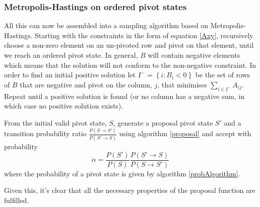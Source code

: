 \subsubsection{Metropolis-Hastings on ordered pivot states}

All this can now be assembled into a sampling algorithm based on Metropolis-Hastings. Starting with the constraints in the form of equation \ref{Axy}, recursively choose a non-zero element on an un-pivoted row and pivot on that element, until we reach an ordered pivot state. In general, $B$ will contain negative elements which means that the solution will not conform to the non-negative constraint. In order to find an initial positive solution let $I^- = \left\{i: B_i < 0\right\}$ be the set of rows of $B$ that are negative and pivot on the column, $j$, that minimises $\sum_{i\in I^-}A_{ij}$. Repeat until a positive solution is found (or no column has a negative sum, in which case no positive solution exists).

From the initial valid pivot state, $S$, generate a proposal pivot state $S'$ and a transition probability ratio $\frac{P(S\rightarrow S')}{P(S' \rightarrow S)}$ using algorithm \ref{proposal} and accept with probability
\[
\alpha = \frac{P(S')}{P(S)}\frac{P(S'\rightarrow S)}{P(S \rightarrow S')}
\]
where the probability of a pivot state is given by algorithm \ref{probAlgorithm}.

Given this, it's clear that all the necessary properties of the proposal function are fulfilled.

